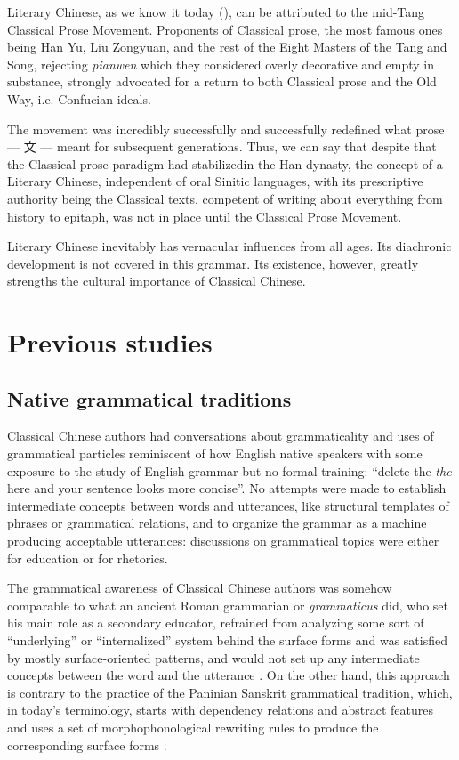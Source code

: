 \documentclass[UTF8, a4paper, oneside, scheme=plain, 12pt]{ctexrep}
\newcommand*{\citepages}[1]{pp.~{#1}}
\newcommand{\form}[1]{\emph{#1}}
\newcommand{\work}[1]{\textit{#1}}
\begin{document}
Literary Chinese, as we know it today (), can be attributed to the mid-Tang Classical Prose Movement.
Proponents of Classical prose, the most famous ones being Han Yu, Liu Zongyuan, and the rest of the Eight Masters of the Tang and Song,
rejecting \work{pianwen} which they considered overly decorative and empty in substance, 
strongly advocated for a return to both Classical prose and the Old Way, i.e. Confucian ideals.

The movement was incredibly successfully and successfully redefined what prose --- 文 --- meant for subsequent generations.
Thus, we can say that despite that the Classical prose paradigm had stabilizedin the Han dynasty,
the concept of a Literary Chinese, 
independent of oral Sinitic languages, 
with its prescriptive authority being the Classical texts, 
competent of writing about everything from history to epitaph,
was not in place until the Classical Prose Movement.

Literary Chinese inevitably has vernacular influences from all ages.
Its diachronic development is not covered in this grammar.
Its existence, however, greatly strengths the cultural importance of Classical Chinese.


\section{Previous studies}

\subsection{Native grammatical traditions}\label{sec:introduction.previous.tradition}

Classical Chinese authors had conversations about grammaticality 
and uses of grammatical particles
reminiscent of how English native speakers
with some exposure to the study of English grammar but no formal training:
``delete the \form{the} here and your sentence looks more concise''.
No attempts were made to establish intermediate concepts between words and utterances,
like structural templates of phrases or grammatical relations, 
and to organize the grammar as a machine producing acceptable utterances:
discussions on grammatical topics were either for education or for rhetorics.

The grammatical awareness of Classical Chinese authors was somehow comparable to 
what an ancient Roman grammarian or \form{grammaticus} did,
who set his main role as a secondary educator,
refrained from analyzing some sort of ``underlying'' or ``internalized'' system behind the surface forms
and was satisfied by mostly surface-oriented patterns,
and would not set up any intermediate concepts between the word and the utterance
\citep[\citepages{7,35,47-48}]{matthews2019graeco}.
On the other hand, this approach is contrary to the practice
of the Paninian Sanskrit grammatical tradition,
which, in today's terminology, starts with dependency relations  and abstract features 
and uses a set of morphophonological rewriting rules to produce the corresponding surface forms
\citep{kiparsky2009architecture}.
\end{document}
